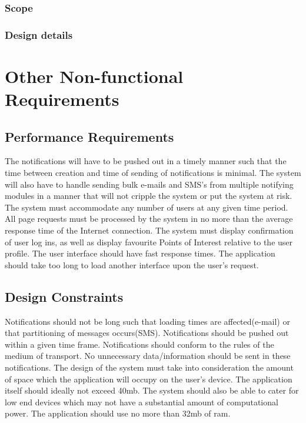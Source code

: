 \documentclass{article}
\begin{document}
\subsubsection{Scope}

\subsubsection{Design details}
\newpage
\section{Other Non-functional Requirements}
\subsection{Performance Requirements}
The notifications will have to be pushed out in a timely manner such that the time between creation and time of sending of notifications is minimal.
\newline
The system will also have to handle sending bulk e-mails and SMS's from multiple notifying modules in a manner that will not cripple the system or put the system at risk.
\newline
The system must accommodate any number of users at any given time period. All page requests must be processed by the system in no more than the average response time of the Internet connection. 
\newline
The system must display confirmation of user log ins, as well as display favourite Points of Interest relative to the user profile.
\newline
The user interface should have fast response times. The application should take too long to load another interface upon the user's request.
\subsection{Design Constraints}

\begin{flushleft}
    Notifications should not be long such that loading times are affected(e-mail) or that partitioning of messages occurs(SMS). Notifications should be pushed out within a given time frame. Notifications should conform to the rules of the medium of transport. No unnecessary data/information should be sent in these notifications. 
\newline
    The design of the system must take into consideration the amount of space which the application will occupy on the user's device. The application itself should ideally not exceed 40mb. The system should also be able to cater for low end devices which may not have a substantial amount of computational power. The application should use no more than 32mb of ram.
    \end{flushleft}
\end{document}
